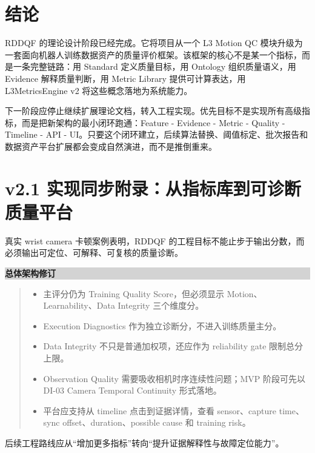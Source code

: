 \documentclass[UTF8,zihao=-4]{ctexart}
\newenvironment{decisionbox}[1]{\vspace{0.5em}\noindent\colorbox{LightGray}{\parbox{0.96\linewidth}{\textbf{#1}}}\par\vspace{-0.2em}\begin{quote}\small}{\end{quote}\vspace{0.3em}}
\begin{document}
\section{结论}

RDDQF 的理论设计阶段已经完成。它将项目从一个 L3 Motion QC 模块升级为一套面向机器人训练数据资产的质量评价框架。该框架的核心不是某一个指标，而是一条完整链路：用 Standard 定义质量目标，用 Ontology 组织质量语义，用 Evidence 解释质量判断，用 Metric Library 提供可计算表达，用 L3MetricsEngine v2 将这些概念落地为系统能力。

下一阶段应停止继续扩展理论文档，转入工程实现。优先目标不是实现所有高级指标，而是把新架构的最小闭环跑通：Feature - Evidence - Metric - Quality - Timeline - API - UI。只要这个闭环建立，后续算法替换、阈值标定、批次报告和数据资产平台扩展都会变成自然演进，而不是推倒重来。


\newpage
\section*{v2.1 实现同步附录：从指标库到可诊断质量平台}

真实 wrist camera 卡顿案例表明，RDDQF 的工程目标不能止步于输出分数，而必须输出可定位、可解释、可复核的质量诊断。

\begin{decisionbox}{总体架构修订}
\begin{itemize}
\item 主评分仍为 Training Quality Score，但必须显示 Motion、Learnability、Data Integrity 三个维度分。
\item Execution Diagnostics 作为独立诊断分，不进入训练质量主分。
\item Data Integrity 不只是普通加权项，还应作为 reliability gate 限制总分上限。
\item Observation Quality 需要吸收相机时序连续性问题；MVP 阶段可先以 DI-03 Camera Temporal Continuity 形式落地。
\item 平台应支持从 timeline 点击到证据详情，查看 sensor、capture time、sync offset、duration、possible cause 和 training risk。
\end{itemize}
\end{decisionbox}

后续工程路线应从“增加更多指标”转向“提升证据解释性与故障定位能力”。
\end{document}
